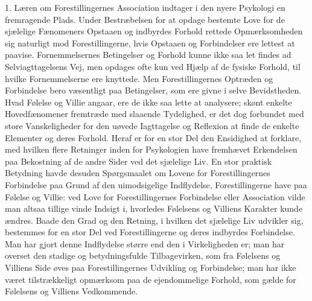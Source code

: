 \documentclass[12pt,a4paper,openany]{book}
\begin{document}
1. Læren om Forestillingernes Association indtager i den nyere Psykologi en
fremragende Plads. Under Bestræbelsen for at opdage bestemte Love for de
sjælelige Fænomeners Opstaaen og indbyrdes Forhold rettede Opmærksomheden sig
naturligt mod Forestillingerne, hvis Opstaaen og Forbindelser ere lettest at
paavise. Fornemmelsernes Betingelser og Forhold kunne ikke saa let findes ad
Selviagttagelsens Vej, men opdages ofte kun ved Hjælp af de fysiske Forhold,
til hvilke Fornemmelserne ere knyttede. Men Forestillingernes Optræden og
Forbindelse bero væsentligt paa Betingelser, som ere givne i selve
Bevidstheden. Hvad Følelse og Villie angaar, ere de ikke saa lette at
analysere; skønt enkelte Hovedfænomener fremtræde med slaaende Tydelighed, er
det dog forbundet med store Vanskeligheder for den uøvede Iagttagelse og
Reflexion at finde de enkelte Elementer og deres Forhold. Heraf er for en stor
Del den Ensidighed at forklare, med hvilken flere Retninger inden for
Psykologien have fremhævet Erkendelsen paa Bekostning af de andre Sider ved det
sjælelige Liv. En stor praktisk Betydning havde desuden Spørgsmaalet om Lovene
for Forestillingernes Forbindelse paa Grund af den uimodsigelige Indflydelse,
Forestillingerne have paa Følelse og Villie: ved Love for Forestillingernes
Forbindelse eller Association vilde man altsaa tillige vinde Indsigt i,
hvorledes Følelsens og Villiens Karakter kunde ændres. Baade den Grad og den
Retning, i hvilken det sjælelige Liv udvikler sig, bestemmes for en stor Del
ved Forestillingerne og deres indbyrdes Forbindelse. Man har gjort denne
Indflydelse større end den i Virkeligheden er; man har overset den stadige og
betydningsfulde Tilbagevirken, som fra Følelsens og Villiens Side øves paa
Forestillingernes Udvikling og Forbindelse; man har ikke været tilstrækkeligt
opmærksom paa de ejendommelige Forhold, som gælde for Følelsens og Villiens
Vedkommende.
\end{document}
